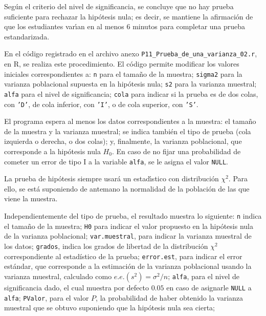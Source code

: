 \begin{solucion}
 \begin{conclusion}
  Seg\'un el criterio del nivel de significancia, se concluye
  que no hay prueba suficiente para rechazar la hip\'otesis nula;
  es decir, se mantiene la afirmaci\'on de que los estudiantes
  var\'{\i}an en al menos $6$ minutos para completar una prueba estandarizada.
 \end{conclusion}

 En el c\'odigo registrado en el archivo anexo
 \texttt{P11\_Prueba\_de\_una\_varianza\_02.r}, en R,
 se realiza este procedimiento.
 El c\'odigo permite modificar los valores iniciales correspondientes a:
 \texttt{n} para el tama\~no de la muestra;
 \texttt{sigma2} para la varianza poblacional supuesta en la hip\'otesis nula;
 \texttt{s2} para la varianza muestral;
 \texttt{alfa} para el nivel de significancia;
 \texttt{cola} para indicar si la prueba es de dos colas,
 con \texttt{'D'}, de cola inferior, con \texttt{'I'},
 o de cola superior, con \texttt{'S'}.
 \par 
 El programa espera al menos los datos correspondientes a la muestra:
 el tama\~no de la muestra y la varianza muestral;
 se indica tambi\'en el tipo de prueba (cola izquierda o derecha,
 o dos colas);
 y, finalmente, la varianza poblacional,
 que corresponde a la hip\'otesis nula $H_0$.
 En caso de no fijar una probabilidad de cometer un error de tipo I
 a la variable \texttt{alfa}, se le asigna el valor \texttt{NULL}.
 \par 
 La prueba de hip\'otesis siempre usar\'a un estad\'{\i}stico
 con distribuci\'on $\chi^2$.
 Para ello, se est\'a suponiendo de antemano la normalidad
 de la poblaci\'on de las que viene la muestra.
 \par
 Independientemente del tipo de prueba, el resultado muestra lo siguiente:
 \texttt{n} indica el tama\~no de la muestra;
 \texttt{H0} para indicar el valor propuesto en la hip\'otesis nula
 de la varianza poblacional;
 \texttt{var.muestral}, para indicar la varianza muestral de los datos;
 \texttt{grados}, indica los grados de libertad de la distribuci\'on $\chi^2$
 correspondiente al estadístico de la prueba;
 \texttt{error.est}, para indicar el error est\'andar,
 que corresponde a la estimaci\'on de la varianza poblacional
 usando la varianza muestral, calculado como $e.e.(s^2)=\sigma^2/n$;
 \texttt{alfa}, para el nivel de significancia dado,
 el cual muestra por defecto $0.05$
 en caso de asignarle \texttt{NULL} a \texttt{alfa};
 \texttt{PValor}, para el valor $P$, la probabilidad
 de haber obtenido la varianza muestral
 que se obtuvo suponiendo que la hip\'otesis nula sea cierta;

\end{solucion}
